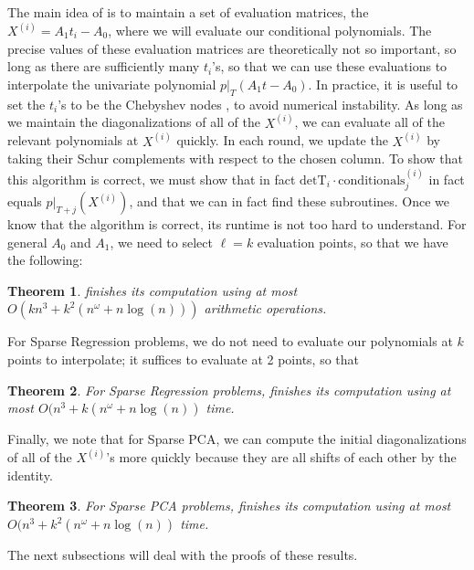 \documentclass{amsart}
\newtheorem{theorem}{Theorem}[section]
\theoremstyle{definition}
\begin{document}
The main idea of  is to maintain a set of evaluation matrices, the $X^{(i)} = A_1t_i - A_0$, where we will evaluate our conditional polynomials.
The precise values of these evaluation matrices are theoretically not so important, so long as there are sufficiently many $t_i$'s, so that we can use these evaluations to interpolate the univariate polynomial $p|_T(A_1t-A_0)$.
In practice, it is useful to set the $t_i$'s to be the Chebyshev nodes \cite{TODO}, to avoid numerical instability.
As long as we maintain the diagonalizations of all of the $X^{(i)}$, we can evaluate all of the relevant polynomials at $X^{(i)}$ quickly.
In each round, we update the $X^{(i)}$ by taking their Schur complements with respect to the chosen column.
To show that this algorithm is correct, we must show that in fact $\text{detT}_i\cdot\text{conditionals}^{(i)}_j$ in fact equals $p|_{T+j}(X^{(i)})$, and that we can in fact find these subroutines.
Once we know that the algorithm is correct, its runtime is not too hard to understand. For general  $A_0$ and $A_1$, we need to select $\ell = k$ evaluation points, so that we have the following:
\begin{theorem}
    \label{thm:alg_runtime_general}
     finishes its computation using at most $O(kn^3 + k^2(n^{\omega}+n\log(n)))$ arithmetic operations.
\end{theorem}
For Sparse Regression problems, we do not need to evaluate our polynomials at $k$ points to interpolate; it suffices to evaluate at 2 points, so that
\begin{theorem}
    \label{thm:alg_runtime_reg}
    For Sparse Regression problems,  finishes its computation using at most $O(n^3 + k(n^{\omega}+n\log(n))$ time.
\end{theorem}
Finally, we note that for Sparse PCA, we can compute the initial diagonalizations of all of the $X^{(i)}$'s more quickly because they are all shifts of each other by the identity.
\begin{theorem}
    \label{thm:alg_runtime_pca}
    For Sparse PCA problems,  finishes its computation using at most $O(n^3 + k^2(n^{\omega}+n\log(n))$ time.
\end{theorem}

The next subsections will deal with the proofs of these results.
\end{document}
